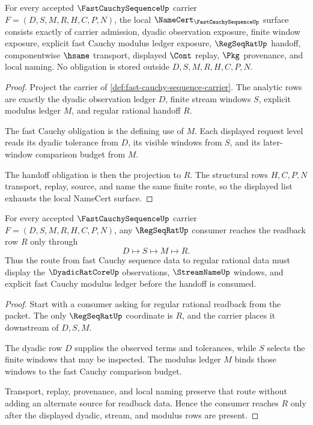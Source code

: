 \begin{theorem}
\label{thm:fast-cauchy-sequence-namecert-obligations}
For every accepted $\FastCauchySequenceUp$ carrier $F=(D,S,M,R,H,C,P,N)$, the local $\NameCert_{\FastCauchySequenceUp}$ surface consists exactly of carrier admission, dyadic observation exposure, finite window exposure, explicit fast Cauchy modulus ledger exposure, $\RegSeqRatUp$ handoff, componentwise $\hsame$ transport, displayed $\Cont$ replay, $\Pkg$ provenance, and local naming. No obligation is stored outside $D,S,M,R,H,C,P,N$.
\end{theorem}
\begin{proof}
Project the carrier of \autoref{def:fast-cauchy-sequence-carrier}. The analytic rows are exactly the dyadic observation ledger $D$, finite stream windows $S$, explicit modulus ledger $M$, and regular rational handoff $R$.

The fast Cauchy obligation is the defining use of $M$. Each displayed request level reads its dyadic tolerance from $D$, its visible windows from $S$, and its later-window comparison budget from $M$.

The handoff obligation is then the projection to $R$. The structural rows $H,C,P,N$ transport, replay, source, and name the same finite route, so the displayed list exhausts the local NameCert surface.
\end{proof}

\begin{theorem}
\label{thm:fast-cauchy-sequence-regseqrat-handoff}
For every accepted $\FastCauchySequenceUp$ carrier $F=(D,S,M,R,H,C,P,N)$, any $\RegSeqRatUp$ consumer reaches the readback row $R$ only through
$$
D\longmapsto S\longmapsto M\longmapsto R .
$$
Thus the route from fast Cauchy sequence data to regular rational data must display the $\DyadicRatCoreUp$ observations, $\StreamNameUp$ windows, and explicit fast Cauchy modulus ledger before the handoff is consumed.
\end{theorem}
\begin{proof}
Start with a consumer asking for regular rational readback from the packet. The only $\RegSeqRatUp$ coordinate is $R$, and the carrier places it downstream of $D,S,M$.

The dyadic row $D$ supplies the observed terms and tolerances, while $S$ selects the finite windows that may be inspected. The modulus ledger $M$ binds those windows to the fast Cauchy comparison budget.

Transport, replay, provenance, and local naming preserve that route without adding an alternate source for readback data. Hence the consumer reaches $R$ only after the displayed dyadic, stream, and modulus rows are present.
\end{proof}

